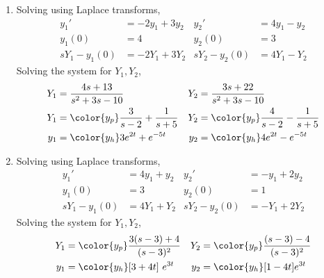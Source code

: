 \begin{enumerate}
    \item Solving using Laplace transforms,
          \begin{align}
              y_1'          & = -2y_1 + 3y_2 &
              y_2'          & = 4y_1 - y_2     \\
              y_1(0)        & = 4            &
              y_2(0)        & = 3              \\
              sY_1 - y_1(0) & = -2Y_1 + 3Y_2 &
              sY_2 - y_2(0) & = 4Y_1 - Y_2
          \end{align}
          Solving the system for $ Y_1, Y_2 $,
          \begin{align}
              Y_1 & = \frac{4s + 13}{s^2 + 3s - 10}             &
              Y_2 & = \frac{3s + 22}{s^2 + 3s - 10}               \\
              Y_1 & = \color{y_p} \frac{3}{s-2} + \frac{1}{s+5} &
              Y_2 & = \color{y_p} \frac{4}{s-2} - \frac{1}{s+5}   \\
              y_1 & = \color{y_h} 3e^{2t} + e^{-5t}             &
              y_2 & = \color{y_h} 4e^{2t} - e^{-5t}               \\
          \end{align}

    \item Solving using Laplace transforms,
          \begin{align}
              y_1'          & = 4y_1 + y_2  &
              y_2'          & = -y_1 + 2y_2   \\
              y_1(0)        & = 3           &
              y_2(0)        & = 1             \\
              sY_1 - y_1(0) & = 4Y_1 + Y_2  &
              sY_2 - y_2(0) & = -Y_1 + 2Y_2
          \end{align}
          Solving the system for $ Y_1, Y_2 $,
          \begin{align}
              Y_1 & = \color{y_p} \frac{3(s - 3) + 4}{(s - 3)^2} &
              Y_2 & = \color{y_p} \frac{(s - 3) - 4}{(s - 3)^2}    \\
              y_1 & = \color{y_h} [3 + 4t]\ e^{3t}               &
              y_2 & = \color{y_h} [1 - 4t] e^{3t}                  \\
          \end{align}


\end{enumerate}

